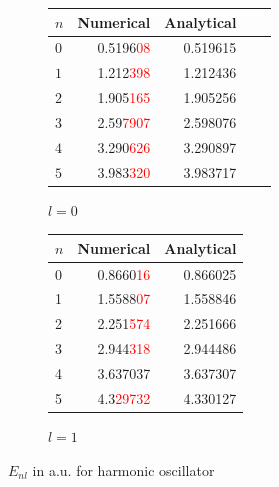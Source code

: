 \documentclass[a4paper, 12pt]{article}
\begin{document}
\begin{figure}[h!]
\centering
\begin{subfigure}{.4\textwidth}
\begin{tabular}{lrrrr}
\toprule
{$n$} &     {Numerical} &     {Analytical}   \\
\midrule
$ 0 $&   0.5196\textcolor{red}{08} &    0.519615 \\
$ 1 $ &   1.212\textcolor{red}{398} &    1.212436 \\
$ 2$ &   1.905\textcolor{red}{165} &    1.905256 \\
$ 3 $ &   2.59\textcolor{red}{7907} &    2.598076 \\
$ 4$ &   3.290\textcolor{red}{626} &    3.290897 \\
$ 5 $ &   3.983\textcolor{red}{320} &    3.983717 \\
\bottomrule
\end{tabular}
\caption{$l=0$}
\end{subfigure}%
\begin{subfigure}{.45\textwidth}
\begin{tabular}{lrr}
\toprule
{$n$} &  Numerical &  Analytical \\
\midrule
0 &   0.8660\textcolor{red}{16} &    0.866025 \\
1 &   1.5588\textcolor{red}{07} &    1.558846 \\
2 &   2.251\textcolor{red}{574} &    2.251666 \\
3 &   2.944\textcolor{red}{318} &    2.944486 \\
4 &   3.637037 &    3.637307 \\
5 &   4.3\textcolor{red}{29732} &    4.330127 \\
\bottomrule
\end{tabular}
\caption{$l=1$}
\end{subfigure}
\caption{$E_{nl}$ in a.u. for harmonic oscillator }
\label{table:Harm_osc}
\end{figure}
\end{document}

